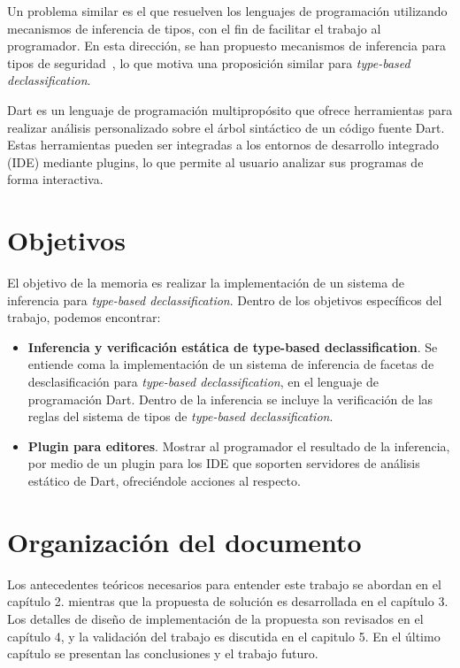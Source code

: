 \begin{intro}
	Un problema similar es el que resuelven los lenguajes de programación utilizando mecanismos de inferencia de tipos, con el fin de facilitar el trabajo al programador. En esta dirección, se han propuesto mecanismos de inferencia para tipos de seguridad~\cite{Pottier}, lo que motiva una proposición similar para \textit{type-based declassification}.

	Dart es un lenguaje de programación multipropósito que ofrece herramientas para realizar análisis personalizado sobre el árbol sintáctico de un código fuente Dart. Estas herramientas pueden ser integradas a los entornos de desarrollo integrado (IDE) mediante plugins, lo que permite al usuario analizar sus programas de forma interactiva.

	\section{Objetivos}
	El objetivo de la memoria es realizar la implementación de un sistema de inferencia para \textit{type-based declassification}. Dentro de los objetivos específicos del trabajo, podemos encontrar:

	\begin{itemize}
	\item \textbf{Inferencia y verificación estática de type-based declassification}. Se entiende coma la implementación de un sistema de inferencia de facetas de desclasificación para \textit{type-based declassification}, en el lenguaje de programación Dart. Dentro de la inferencia se incluye la verificación de las reglas del sistema de tipos de \textit{type-based declassification}.

	\item \textbf{Plugin para editores}. Mostrar al programador el resultado de la inferencia, por medio de un plugin para los IDE que soporten servidores de análisis estático de Dart, ofreciéndole acciones al respecto.

	\end{itemize}

	\section{Organización del documento}

	Los antecedentes teóricos necesarios para entender este trabajo se abordan en el capítulo 2. mientras que la propuesta de solución es desarrollada en el capítulo 3. Los detalles de diseño de implementación de la propuesta son revisados en el capítulo 4, y la validación del trabajo es discutida en el capitulo 5. En el último capítulo se presentan las conclusiones y el trabajo futuro.

\end{intro}
